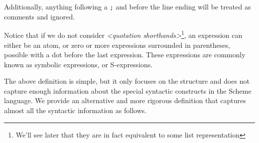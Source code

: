 \documentclass{article}
\begin{document}
Additionally, anything following a \texttt{;} and before the line ending will be treated as comments and ignored.

Notice that if we do not consider \emph{<quotation shorthands>}\footnote{We'll see later that they are in fact equivalent to some list representation}, an expression can either be an atom, or zero or more expressions surrounded in parentheses, possible with a dot before the last expression. These expressions are commonly known as symbolic expressions, or S-expressions.

The above definition is simple, but it only focuses on the structure and does not capture enough information about the special syntactic constructs in the Scheme language. We provide an alternative and more rigorous definition that captures almost all the syntactic information as follows.
\end{document}
